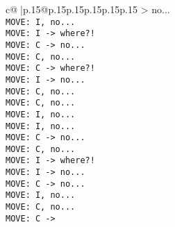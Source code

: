 \documentclass{article}
\begin{document}
{\begin{supertabular}{c@{$\;$}|p{.15\linewidth}@{}p{.15\linewidth}p{.15\linewidth}p{.15\linewidth}p{.15\linewidth}p{.15\linewidth}}
{{{> no...\\ \tt  MOVE: I, no...\\ \tt  MOVE: I -> where?!\\ \tt  MOVE: C -> no...\\ \tt  MOVE: C, no...\\ \tt  MOVE: C -> where?!\\ \tt  MOVE: I -> no...\\ \tt  MOVE: C, no...\\ \tt  MOVE: C, no...\\ \tt  MOVE: I, no...\\ \tt  MOVE: I, no...\\ \tt  MOVE: C -> no...\\ \tt  MOVE: C, no...\\ \tt  MOVE: I -> where?!\\ \tt  MOVE: I -> no...\\ \tt  MOVE: C -> no...\\ \tt  MOVE: I, no...\\ \tt  MOVE: C, no...\\ \tt  MOVE: C ->}}}
\end{supertabular}}
\end{document}
